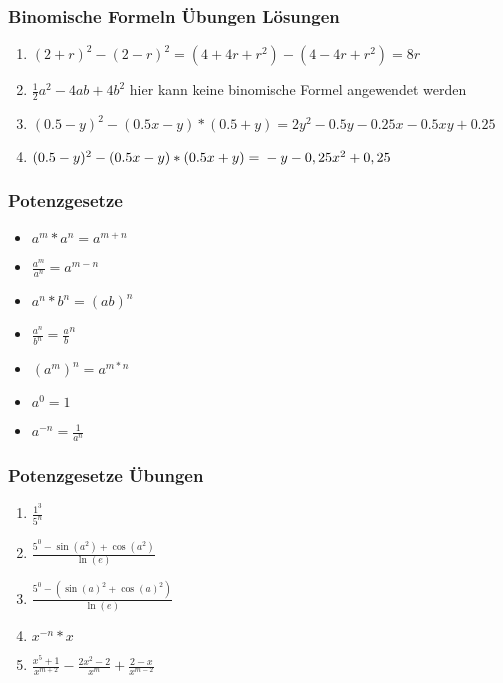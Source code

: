 \begin{frame}
    \frametitle{Binomische Formeln Übungen Lösungen}
    \begin{enumerate}
        \vfill \item $(2+r)^2 - (2-r)^2 = (4 + 4r +r^2) - (4 - 4r + r^2) = 8r$
        \vfill \item $\frac{1}{2}a^2 - 4ab + 4b^2$ hier kann keine binomische Formel angewendet werden
        \vfill \item $(0.5-y)^2 - (0.5x - y)*(0.5 + y) = 2y^2 -0.5y-0.25x-0.5xy+0.25$
	\vfill \item $(0.5-y)^2 - (0.5x - y)*(0.5x + y) =
	\newline -y - 0,25x^2 + 0,25$
    \end{enumerate}
\end{frame}


\begin{frame}
    \frametitle{Potenzgesetze}
	\begin{itemize}
		\vfill \item $a^m * a^n = a^{m+n}$
		\vfill \item $\frac{a^m}{a^n} = a^{m-n}$
		\vfill \item $a^n * b^n = (ab)^n$
		\vfill \item $\frac{a^n}{b^n} = \frac{a}{b}^n$
		\vfill \item $(a^m)^n = a^{m*n}$
		\vfill \item $a^0 = 1$
		\vfill \item $a^{-n} = \frac{1}{a^n}$
	\end{itemize}
\end{frame}

\begin{frame}
    \frametitle{Potenzgesetze Übungen}
	\begin{enumerate}
		\vfill \item $\frac{1^3}{5^n}$
		\vfill \item $\frac{5^0- \sin(a^2) + \cos(a^2)}{\ln(e)}$
		\vfill \item $\frac{5^0-( \sin(a)^2 + \cos(a)^2)}{\ln(e)}$
		\vfill \item $x^{-n} * x$
		\vfill \item $\frac{x^5 +1}{x^{m+2}} - \frac{2x^2-2}{x^m} + \frac{2-x}{x^{m-2}}$
	\end{enumerate}
\end{frame}

